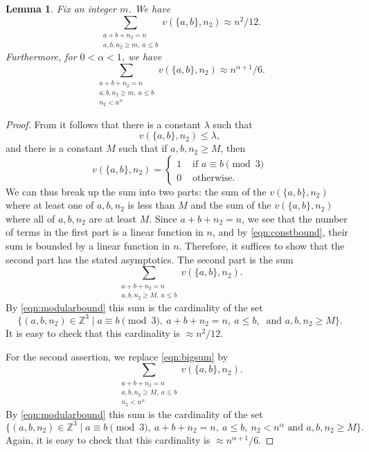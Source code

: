 \documentclass{amsart}
\numberwithin{equation}{section} \numberwithin{figure}{section}
\newcommand\ZZ{\mathbb{Z}}
\theoremstyle{one}
\newtheorem{lemma}[theorem]{\textbf{Lemma}}
\theoremstyle{definition}
\begin{document}
\begin{lemma}\label{lem:estimates}
  Fix an integer \(m\).
  We have
  \[ \sum_{\substack{a+b+n_2 = n\\ a,b,n_2 \geq m,\ a \leq b}}v(\{a,b\},n_2) \approx n^2/12.\]
  Furthermore, for \(0 < \alpha < 1\), we have
  \[ \sum_{\substack{a+b+n_2 = n\\a,b,n_2 \geq m,\ a \leq b\\n_2 < n^{\alpha}}} v(\{a,b\},n_2) \approx n^{\alpha+1}/6.\]
\end{lemma}
\begin{proof}
  From  it follows that there is a constant $\lambda$ such that
  \begin{equation}\label{eqn:constbound}
    v(\{a,b\},n_2) \leq \lambda,
  \end{equation}
  and there is a constant \(M\) such that if \(a,b, n_2 \geq M\), then
  \begin{equation}\label{eqn:modularbound}
    v(\{a,b\},n_2) = \begin{cases} 1 & \text{ if } a \equiv b \pmod 3 \\
      0 &\text{ otherwise.}\end{cases}
  \end{equation}
  We can thus break up the sum into two parts: the sum of the \(v(\{a,b\},n_2)\) where at least one of \(a,b,n_2\) is less than \(M\) and the sum of the \(v(\{a,b\},n_2)\) where all of \(a,b,n_2\) are at least \(M\).
  Since \(a+b+n_2 = n\), we see that the number of terms in the first part is a linear function in \(n\), and by \eqref{eqn:constbound}, their sum is bounded by a linear function in \(n\).
  Therefore, it suffices to show that the second part has the stated asymptotics.
  The second part is the sum   
  \begin{equation}\label{eqn:bigsum}
    \sum_{\substack{a+b+n_2 = n\\ a,b,n_2 \geq M,\ a \leq b}} v(\{a,b\},n_2).
  \end{equation}
  By \eqref{eqn:modularbound} this sum is the cardinality of the set
  \[ \{(a,b,n_2) \in \ZZ^3 \mid a \equiv b \pmod 3,\  a+b+n_2 = n,\  a \leq b,\  \text{ and } a,b,n_2 \geq M\}.\]
  It is easy to check that this cardinality is \(\approx n^2/12\).

  For the second assertion, we replace \eqref{eqn:bigsum} by
  \begin{equation}\label{eqn:bigsum2}
    \sum_{\substack{a+b+n_2 = n\\a,b,n_2 \geq M,\ a \leq b \\n_2 < n^{\alpha}}} v(\{a,b\},n_2).
  \end{equation}
  By \eqref{eqn:modularbound} this sum is the cardinality of the set
  \[ \{(a,b,n_2) \in \ZZ^3 \mid a \equiv b \pmod 3,\  a+b+n_2 = n,\  a\leq b,\  n_2 < n^{\alpha} \text{ and } a,b,n_2 \geq M\}.\]
  Again, it is easy to check that this cardinality is \(\approx n^{\alpha+1}/6.\)
\end{proof}
\end{document}
